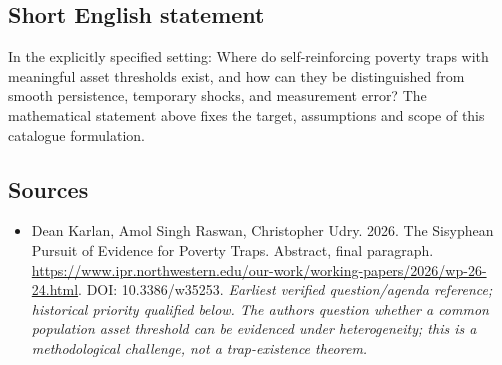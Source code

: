 \documentclass[11pt]{article}
\begin{document}
\subsection{Short English statement}
In the explicitly specified setting: Where do self-reinforcing poverty traps with meaningful asset thresholds exist, and how can they be distinguished from smooth persistence, temporary shocks, and measurement error? The mathematical statement above fixes the target, assumptions and scope of this catalogue formulation.

\subsection{Sources}
\begin{itemize}\raggedright
\item[\textnormal{[S1]}]\hypertarget{source:30007652:1}{} Dean Karlan, Amol Singh Raswan, Christopher Udry. 2026. The Sisyphean Pursuit of Evidence for Poverty Traps. Abstract, final paragraph.
\url{https://www.ipr.northwestern.edu/our-work/working-papers/2026/wp-26-24.html}.
DOI: 10.3386/w35253.
{\small\textit{Earliest verified question/agenda reference; historical priority qualified below. The authors question whether a common population asset threshold can be evidenced under heterogeneity; this is a methodological challenge, not a trap-existence theorem.}}
\end{itemize}
\end{document}
